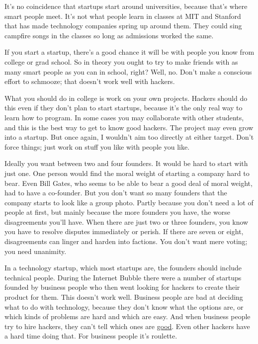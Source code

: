 \documentclass[12pt]{book}
\begin{document}
It's no coincidence that startups start around universities, because
that's where smart people meet. It's not what people learn in classes at
MIT and Stanford that has made technology companies spring up around
them. They could sing campfire songs in the classes so long as
admissions worked the same.

If you start a startup, there's a good chance it will be with people you
know from college or grad school. So in theory you ought to try to make
friends with as many smart people as you can in school, right? Well, no.
Don't make a conscious effort to schmooze; that doesn't work well with
hackers.

What you should do in college is work on your own projects. Hackers
should do this even if they don't plan to start startups, because it's
the only real way to learn how to program. In some cases you may
collaborate with other students, and this is the best way to get to know
good hackers. The project may even grow into a startup. But once again,
I wouldn't aim too directly at either target. Don't force things; just
work on stuff you like with people you like.

Ideally you want between two and four founders. It would be hard to
start with just one. One person would find the moral weight of starting
a company hard to bear. Even Bill Gates, who seems to be able to bear a
good deal of moral weight, had to have a co-founder. But you don't want
so many founders that the company starts to look like a group photo.
Partly because you don't need a lot of people at first, but mainly
because the more founders you have, the worse disagreements you'll have.
When there are just two or three founders, you know you have to resolve
disputes immediately or perish. If there are seven or eight,
disagreements can linger and harden into factions. You don't want mere
voting; you need unanimity.

In a technology startup, which most startups are, the founders should
include technical people. During the Internet Bubble there were a number
of startups founded by business people who then went looking for hackers
to create their product for them. This doesn't work well. Business
people are bad at deciding what to do with technology, because they
don't know what the options are, or which kinds of problems are hard and
which are easy. And when business people try to hire hackers, they can't
tell which ones are \href{gh.html}{good}. Even other hackers have a hard
time doing that. For business people it's roulette.
\end{document}
